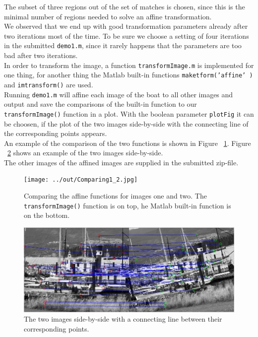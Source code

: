 \documentclass[11pt]{article}
\begin{document}
The subset of three regions out of the set of matches is chosen, since this is the minimal number of regions needed to solve an affine transformation.\\
We observed that we end up with good transformation parameters already after two iterations most of the time. To be sure we choose a setting of four iterations in the submitted \texttt{demo1.m}, since it rarely happens that the parameters are too bad after two iterations.\\
In order to transform the image, a function \texttt{transformImage.m} is implemented for one thing, for another thing the Matlab built-in functions \texttt{maketform('affine' )} and \texttt{imtransform()} are used.\\
Running \texttt{demo1.m} will affine each image of the boat to all other images and output and save the comparisons of the built-in function to our \texttt{transformImage()} function in a plot. With the boolean parameter \texttt{plotFig} it can be choosen, if the plot of the two images side-by-side with the connecting line of the corresponding points appears.\\
An example of the comparison of the two functions is shown in Figure ~\ref{affine}. Figure ~\ref{side_by_side} shows an example of the two images side-by-side.\\
The other images of the affined images are supplied in the submitted zip-file.

\begin{figure}[h!]
\begin{flushleft}
\texttt{[image: ../out/Comparing1\_2.jpg]}
\caption{Comparing the affine functions for images one and two. The \texttt{transformImage()} function is on top, he Matlab built-in function is on the bottom.}
\label{affine}
\end{flushleft}
\end{figure}

\begin{figure}[h!]
\begin{flushleft}
\includegraphics[scale=0.7]{side_by_side.jpg}
\caption{The two images side-by-side with a connecting line between their corresponding points.}
\label{side_by_side}
\end{flushleft}
\end{figure}
\end{document}
